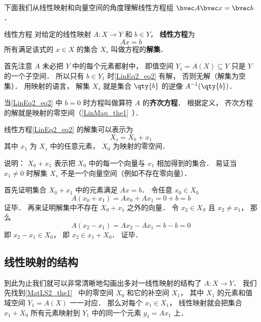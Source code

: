 

下面我们从线性映射和向量空间的角度理解线性方程组 $\bvec A \bvec x = \bvec b$．


\begin{definition}{线性方程}
对给定的线性映射 $A:X\to Y$ 和 $b \in Y$， \textbf{线性方程}为
\begin{equation}\label{LinEq2_eq2}
Ax = b
\end{equation}
所有满足该式的 $x \in X$ 的集合 $X_s$ 叫做方程的\textbf{解集}．
\end{definition}

首先注意 $A$ 未必把 $Y$ 中的每个元素都射中， 即值空间 $Y_1 = A(X) \subseteq Y$ 只是 $Y$ 的一个子空间． 所以只有 $b \in Y_1$ 时\autoref{LinEq2_eq2} 有解， 否则无解（解集为空集）． 用映射的语言， 解集 $X_s$ 就是集合 $\qty{b}$ 的逆像 $A^{-1}(\qty{b})$．

当\autoref{LinEq2_eq2} 中 $b = 0$ 时方程叫做算符 $A$ 的\textbf{齐次方程}． 根据定义， 齐次方程的解就是映射的零空间（\autoref{LinMap_the1}~）．

\begin{theorem}{}
线性方程\autoref{LinEq2_eq2} 的解集可以表示为
\begin{equation}\label{LinEq2_eq1}
X_s = X_0 + x_1
\end{equation}
其中 $x_1$ 为 $X_s$ 中的任意元素，  $X_0$ 为映射的零空间．
\end{theorem}
说明： $X_0 + x_1$ 表示把 $X_0$ 中的每一个向量与 $x_1$ 相加得到的集合． 易证当 $x_1 \ne 0$ 时解集 $X_s$ 不是一个向量空间（例如不存在零向量）．

首先证明集合 $X_0 + x_1$ 中的元素满足 $Ax = b$． 令任意 $x_0 \in X_0$
\begin{equation}
A(x_0 + x_1) = Ax_0 + Ax_1 = 0 + b = b
\end{equation}
证毕． 再来证明解集中不存在 $X_0 + x_1$ 之外的向量． 令 $x_2 \in X_S$ 且 $x_2 \ne x_1$， 那么
\begin{equation}
A(x_2 - x_1) = Ax_2 - Ax_1 = b - b = 0
\end{equation}
即 $x_2 - x_1 \in X_0$， 即 $x_2 \in x_1 + X_0$． 证毕．

\subsection{线性映射的结构}
到此为止我们就可以非常清晰地勾画出多对一线性映射的结构了 $A:X\to Y$． 我们先找到\autoref{MatLS2_the1}~ 中的零空间 $X_0$ 和它的补空间 $X_1$， 其中 $X_1$ 的元素和值域空间 $Y_1 = A(X)$ 一一对应． 那么对每个 $x_1 \in X_1$， 线性映射就会把集合 $x_1 + X_0$ 所有元素映射到 $Y_1$ 中的同一个元素 $y_1 = Ax_1$ 上．

